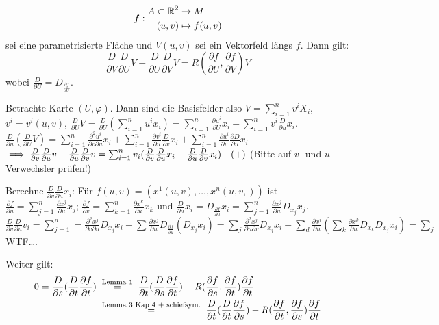 \documentclass[a4paper,twoside,DIV15,BCOR12mm]{scrbook}
\begin{document}
\begin{lemma}
$\ $\[
f: 
\begin{aligned}
A\subset \mathbb{R}^2 &\to M \\ (u,v) &\mapsto f(u,v)
\end{aligned}
\] sei eine parametrisierte Fläche und $V(u,v)$ sei ein Vektorfeld längs $f$. Dann gilt:
\[
\frac{D}{\partial V}\frac{D}{\partial U} V - \frac{D}{\partial U}\frac{D}{\partial V} V
 = R(\frac{\partial f}{\partial U}, \frac{\partial f}{\partial V})V
\]
wobei $\frac{D}{\partial U} = D_{\frac{\partial f}{\partial U}}$.
\end{lemma}
\begin{beweis}

Betrachte Karte $(U,\varphi)$. Dann sind die Basisfelder also $V=\sum_{i=1}^n v^iX_i$, $v^i= v^i(u,v)$, $\frac{D}{\partial U}V = \frac{D}{\partial U}(\sum_{i=1}^n u^ix_i) = \sum_{i=1}^n \frac{\partial u^i}{\partial U} x_i + \sum_{i=1}^n v^i \frac{D}{\partial u}x_i$. $\frac D {\partial u}(\frac D{\partial U} V) = \sum_{i=1}^n \frac{\partial ^2 u^i}{\partial v \partial u} x_i + \sum_{i=1}^n \frac{\partial v^i}{\partial u} \frac D{\partial v} x_i + \sum_{i=1}^n \frac{\partial u^i}{\partial v} \frac{\partial D}{\partial u} x_i$
$\implies \frac{D}{\partial v}\frac D{\partial u} v - \frac D {\partial u}\frac D{\partial v} v = \sum_{i=1}^n v_i (\frac{D}{\partial v}\frac{D}{\partial u} x_i - \frac D{\partial u}\frac D{\partial v} x_i)\quad (+)$ (Bitte auf $v$- und $u$-Verwechsler prüfen!)

Berechne $\frac D{\partial v}\frac D{\partial u} x_i$: Für $f(u,v) = (x^1(u,v),\ldots, x^n(u,v,))$ ist $\frac {\partial f}{\partial u} = \sum_{j=1}^n \frac{\partial x^j}{\partial u} x_j$; $\frac {\partial f}{\partial v} = \sum_{k=1}^n \frac{\partial x^k}{\partial u} x_k$ und $\frac D {\partial u} x_i = D_{\frac {\partial f}{\partial u}} x_i = \sum_{j=1}^n \frac{\partial x^j}{\partial u} D_{x_j} x_j$. $\frac D{\partial v}\frac D {\partial u} v_i = \sum_{j=1}^n = \frac{\partial ^2 x^j}{\partial v\partial u} D_{x_j}  x_i + \sum \frac{\partial x^j}{\partial u} D_{\frac{\partial f}{\partial u}} (D_{x_j}x_i) = \sum_{j} \frac{\partial ^2 x^j}{\partial u\partial v} D_{x_j}x_i + \sum_d \frac{\partial x^i}{\partial u} (\sum_k \frac{\partial x^k}{\partial u} D_{x_k}D_{x_j}x_i) = \sum_{j}$ WTF\dots.

\end{beweis}


Weiter gilt:
\begin{align*}
0 = \frac D {\partial s} (\frac D {\partial t} \frac {\partial f}{\partial t}) &\gleichnach{Lemma 1} \frac D{\partial t} (\frac D {\partial s} \frac{\partial f}{\partial t}) - R(\frac {\partial f}{\partial s},\frac{\partial f}{\partial t}) \frac{\partial f}{\partial t} \\
&\gleichnach{Lemma 3 Kap 4 + schiefsym.}
\frac D{\partial t} (\frac D {\partial t} \frac{\partial f}{\partial s}) - R(\frac {\partial f}{\partial t},\frac{\partial f}{\partial s}) \frac{\partial f}{\partial t}
\end{align*}
\end{document}
